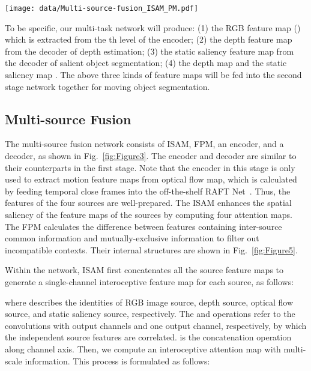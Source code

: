 \documentclass[sigconf]{acmart}
\begin{document}
\begin{figure*}
\texttt{[image: data/Multi-source-fusion\_ISAM\_PM.pdf]}
        \centering
        \caption{Detailed diagram of interoceptive spatial attention module (ISAM) and feature purification module (FPM).}
\label{fig:Figure5}
\end{figure*} 
To be specific, our multi-task network will produce: (1) the RGB feature map  () which is extracted from the th level of the encoder; (2) the depth feature map   from the decoder of depth estimation; (3) the static saliency feature map  from the decoder of salient object segmentation; (4) the depth map and the static saliency map .  The above three kinds of feature maps will be fed into the second stage network together for moving object segmentation. 









\subsection{Multi-source Fusion}


The multi-source fusion network consists of ISAM, FPM, an encoder, and a decoder, as shown in Fig.~\ref{fig:Figure3}. The encoder and decoder are similar to their counterparts in the first stage. Note that the encoder in this stage is only used to extract motion feature maps   from optical flow map, which is calculated by feeding temporal close frames into the off-the-shelf RAFT Net~\cite{RAFT}. Thus, the features of the four sources are well-prepared. The ISAM enhances the spatial saliency of the feature maps of the sources by computing four attention maps. The FPM calculates the difference between features containing inter-source common information and mutually-exclusive information to filter out incompatible contexts. Their internal structures are shown in Fig.~\ref{fig:Figure5}.  

Within the network, ISAM first concatenates all the source feature maps to generate a single-channel interoceptive feature map for each source, as follows:

where  describes the identities of RGB image source, depth source, optical flow source, and static saliency source, respectively. The  and  operations refer to the  convolutions with  output channels and one output channel, respectively, by which the independent source features are correlated.
 is the concatenation operation along channel axis. 
Then, we compute an interoceptive attention map
with multi-scale information. This process is formulated as follows:
\end{document}
